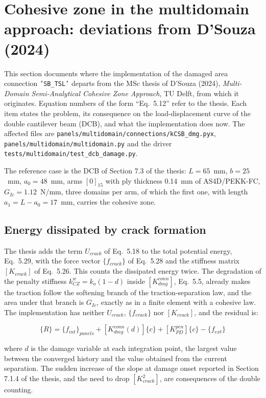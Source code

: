 \section{Cohesive zone in the multidomain approach: deviations from D'Souza (2024)}\label{sec:cz-deviations}

This section documents where the implementation of the damaged area connection \texttt{'SB\_TSL'} departs from the MSc thesis of D'Souza (2024), \textit{Multi-Domain Semi-Analytical Cohesive Zone Approach}, TU Delft, from which it originates. Equation numbers of the form ``Eq.~5.12'' refer to the thesis. Each item states the problem, its consequence on the load-displacement curve of the double cantilever beam (DCB), and what the implementation does now. The affected files are \texttt{panels/multidomain/connections/kCSB\_dmg.pyx}, \texttt{panels/multidomain/multidomain.py} and the driver \texttt{tests/multidomain/test\_dcb\_damage.py}.

The reference case is the DCB of Section 7.3 of the thesis: $L=65$~mm, $b=25$~mm, $a_0=48$~mm, arms $[0]_{15}$ with ply thickness 0.14~mm of AS4D/PEKK-FC, $G_{Ic}=1.12$~N/mm, three domains per arm, of which the first one, with length $a_1 = L - a_0 = 17$~mm, carries the cohesive zone.

\subsection{Energy dissipated by crack formation}\label{sec:cz-dev-ucrack}

The thesis adds the term $U_{crack}$ of Eq.~5.18 to the total potential energy, Eq.~5.29, with the force vector $\{f_{crack}\}$ of Eq.~5.28 and the stiffness matrix $[K_{crack}]$ of Eq.~5.26. This counts the dissipated energy twice. The degradation of the penalty stiffness $k^w_{CZ} = k_o(1-d)$ inside $[K^{conn}_{dmg}]$, Eq.~5.5, already makes the traction follow the softening branch of the traction-separation law, and the area under that branch is $G_{Ic}$, exactly as in a finite element with a cohesive law. The implementation has neither $U_{crack}$, $\{f_{crack}\}$ nor $[K_{crack}]$, and the residual is:

\begin{equation}\label{eq:cz-dev-residual}
	\{R\} = \{f_{int}\}_{panels} + [K^{conn}_{dmg}(d)]\{c\} + [K^{pen}_{PD}]\{c\} - \{f_{ext}\}
\end{equation}

\noindent where $d$ is the damage variable at each integration point, the largest value between the converged history and the value obtained from the current separation. The sudden increase of the slope at damage onset reported in Section 7.1.4 of the thesis, and the need to drop $[K^2_{crack}]$, are consequences of the double counting.

